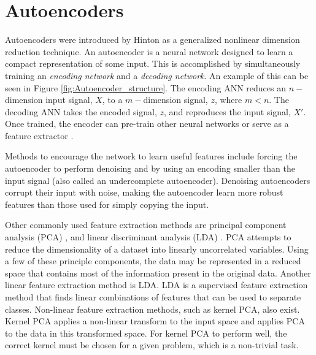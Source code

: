 \section{Autoencoders} \label{Autoencoders}

Autoencoders were introduced by Hinton \cite{Hinton2006} as a generalized nonlinear dimension reduction technique. An autoencoder is a neural network designed to learn a compact representation of some input. This is accomplished by simultaneously training an \textit{encoding network} and a \textit{decoding network}. An example of this can be seen in Figure \ref{fig:Autoencoder_structure}. The encoding ANN reduces an $n-$dimension input signal, $X$, to a $m-$dimension signal, $z$, where $m < n$. The decoding ANN takes the encoded signal, $z$, and reproduces the input signal, $X'$. Once trained, the encoder can pre-train other neural networks or serve as a feature extractor \cite{Erhan2010,CHARTE2018}. 

Methods to encourage the network to learn useful features include forcing the autoencoder to perform denoising \cite{Vincent2008, Vincent2010} and by using an encoding smaller than the input signal (also called an undercomplete autoencoder). Denoising autoencoders corrupt their input with noise, making the autoencoder learn more robust features than those used for simply copying the input. 


Other commonly used feature extraction methods are principal component analysis (PCA) \cite{Jolliffe2002}, and linear discriminant analysis (LDA) \cite{Welling2007}. PCA attempts to reduce the dimensionality of a dataset into linearly uncorrelated variables. Using a few of these principle components, the data may be represented in a reduced space that contains most of the information present in the original data. Another linear feature extraction method is LDA. LDA is a supervised feature extraction method that finds linear combinations of features that can be used to separate classes. Non-linear feature extraction methods, such as kernel PCA, also exist. Kernel PCA applies a non-linear transform to the input space and applies PCA to the data in this transformed space. For kernel PCA to perform well, the correct kernel must be chosen for a given problem, which is a non-trivial task.




